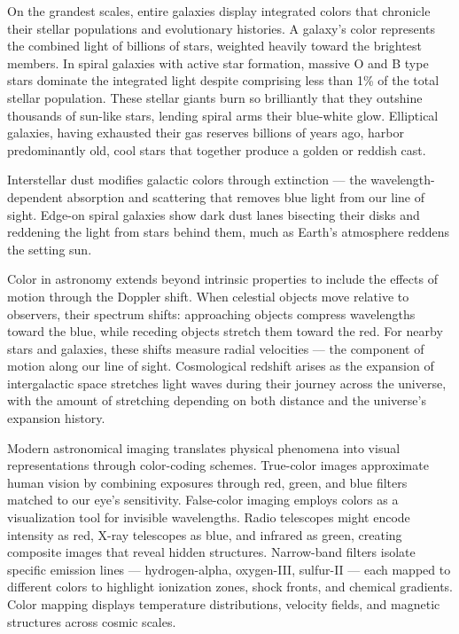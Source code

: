 On the grandest scales, entire galaxies display integrated colors that chronicle their stellar populations and evolutionary histories. A galaxy's color represents the combined light of billions of stars, weighted heavily toward the brightest members. In spiral galaxies with active star formation, massive O and B type stars dominate the integrated light despite comprising less than 1\% of the total stellar population. These stellar giants burn so brilliantly that they outshine thousands of sun-like stars, lending spiral arms their blue-white glow. Elliptical galaxies, having exhausted their gas reserves billions of years ago, harbor predominantly old, cool stars that together produce a golden or reddish cast.

Interstellar dust modifies galactic colors through extinction — the wavelength-dependent absorption and scattering that removes blue light from our line of sight. Edge-on spiral galaxies show dark dust lanes bisecting their disks and reddening the light from stars behind them, much as Earth's atmosphere reddens the setting sun.

Color in astronomy extends beyond intrinsic properties to include the effects of motion through the Doppler shift. When celestial objects move relative to observers, their spectrum shifts: approaching objects compress wavelengths toward the blue, while receding objects stretch them toward the red. For nearby stars and galaxies, these shifts measure radial velocities — the component of motion along our line of sight. Cosmological redshift arises as the expansion of intergalactic space stretches light waves during their journey across the universe, with the amount of stretching depending on both distance and the universe's expansion history.

Modern astronomical imaging translates physical phenomena into visual representations through color-coding schemes. True-color images approximate human vision by combining exposures through red, green, and blue filters matched to our eye's sensitivity. False-color imaging employs colors as a visualization tool for invisible wavelengths. Radio telescopes might encode intensity as red, X-ray telescopes as blue, and infrared as green, creating composite images that reveal hidden structures. Narrow-band filters isolate specific emission lines — hydrogen-alpha, oxygen-III, sulfur-II — each mapped to different colors to highlight ionization zones, shock fronts, and chemical gradients. Color mapping displays temperature distributions, velocity fields, and magnetic structures across cosmic scales.

